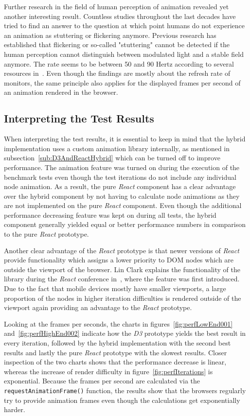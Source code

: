 Further research in the field of human perception of animation revealed yet another interesting result. Countless studies throughout the last decades have tried to find an answer to the question at which point humans do not experience an animation as stuttering or flickering anymore. Previous research has established that flickering or so-called "stuttering" cannot be detected if the human perception cannot distinguish between modulated light and a stable field anymore. The rate seems to be between 50 and 90 Hertz according to several resources in~\cite{6375944,farrell1987predicting,stereoscopicFlickerArticle}. Even though the findings are mostly about the refresh rate of monitors, the same principle also applies for the displayed frames per second of an animation rendered in the browser.

\subsection{Interpreting the Test Results}

When interpreting the test results, it is essential to keep in mind that the hybrid implementation uses a custom animation library internally, as mentioned in subsection~\ref{sub:D3AndReactHybrid} which can be turned off to improve performance. The animation feature was turned on during the execution of the benchmark tests even though the test iterations do not include any individual node animation. As a result, the pure \emph{React} component has a clear advantage over the hybrid component by not having to calculate node animations as they are not implemented on the pure \emph{React} component. Even though the additional performance decreasing feature was kept on during all tests, the hybrid component generally yielded equal or better performance numbers in comparison to the pure \emph{React} prototype.

Another clear advantage of the \emph{React} prototype is that newer versions of \emph{React} provide functionality which assigns a lower priority to DOM nodes which are outside the viewport of the browser. Lin Clark explains the functionality of the library during the \emph{React} conference in~\cite{ReactReconcliliationVideo}, where the feature was first introduced. Due to the fact that mobile devices mostly have smaller viewports, a large proportion of the nodes in higher iteration difficulties is rendered outside of the viewport again providing an advantage to the \emph{React} prototype.

Looking at the frames per seconds, the charts in figures~\ref{fig:perfLowEnd001} and~\ref{fig:perfHighEnd002} indicate how the \emph{D3} prototype yields the best result in every iteration, followed by the hybrid implementation with the second best results and lastly the pure \emph{React} prototype with the slowest results. Closer inspection of the two charts shows that the performance decrease is linear, whereas the increase of render difficulty in figure~\ref{fig:perfIterations} is exponential. Because the frames per second are calculated via the \texttt{requestAnimationFrame()} function, the results show that the browsers regularly try to provide animation frames even though the calculations get exponentially harder.

